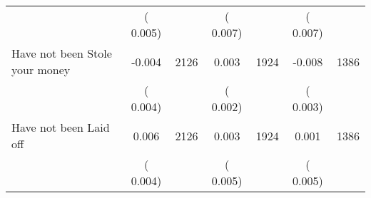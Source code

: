 \begin{tabular}{l*{6}{c}}
                       &       (       0.005)            &                               &       (       0.007)            &                               &       (       0.007)            &                               \\
Have not been Stole your money        &             -0.004      &       2126       &              0.003      &       1924       &             -0.008      &       1386       \\
                       &       (       0.004)            &                               &       (       0.002)            &                               &       (       0.003)            &                               \\
Have not been Laid off        &              0.006      &       2126       &              0.003      &       1924       &              0.001      &       1386       \\
                       &       (       0.004)            &                               &       (       0.005)            &                               &       (       0.005)            &                               \\
\hline \end{tabular}